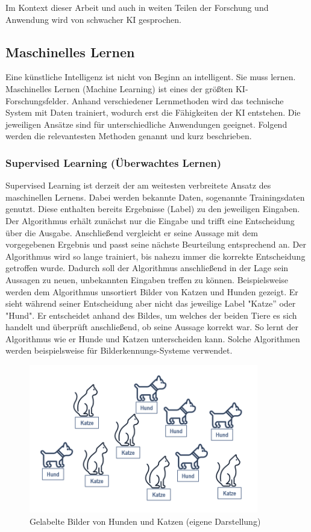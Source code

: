 \documentclass[a4paper,12pt, german]{report}
\begin{document}
Im Kontext dieser Arbeit und auch in weiten Teilen der Forschung und Anwendung wird von schwacher KI gesprochen.\cite{01}\cite{15}

\subsection{Maschinelles Lernen}

Eine künstliche Intelligenz ist nicht von Beginn an intelligent. Sie muss lernen. Maschinelles Lernen (Machine Learning) ist eines der größten KI-Forschungsfelder. Anhand verschiedener Lernmethoden wird das technische System mit Daten trainiert, wodurch erst die Fähigkeiten der KI entstehen. Die jeweiligen Ansätze sind für unterschiedliche Anwendungen geeignet. \newline
Folgend werden die relevantesten Methoden genannt und kurz beschrieben.\cite{10}

\subsubsection{Supervised Learning (Überwachtes Lernen)} 

Supervised Learning ist derzeit der am weitesten verbreitete Ansatz des maschinellen Lernens. Dabei werden bekannte Daten, sogenannte Trainingsdaten genutzt. Diese enthalten bereits Ergebnisse (Label) zu den jeweiligen Eingaben. Der Algorithmus erhält zunächst nur die Eingabe und trifft eine Entscheidung über die Ausgabe. Anschließend vergleicht er seine Aussage mit dem vorgegebenen Ergebnis und passt seine nächste Beurteilung entsprechend an. Der Algorithmus wird so lange trainiert, bis nahezu immer die korrekte Entscheidung getroffen wurde. Dadurch soll der Algorithmus anschließend in der Lage sein Aussagen zu neuen, unbekannten Eingaben treffen zu können.\cite{01}\cite{05} \newline
Beispielsweise werden dem Algorithmus unsortiert Bilder von Katzen und Hunden gezeigt. Er sieht während seiner Entscheidung aber nicht das jeweilige Label "Katze'' oder "Hund". Er entscheidet anhand des Bildes, um welches der beiden Tiere es sich handelt und überprüft anschließend, ob seine Aussage korrekt war. So lernt der Algorithmus wie er Hunde und Katzen unterscheiden kann. Solche Algorithmen werden beispielsweise für Bilderkennungs-Systeme verwendet. 
\begin{figure}
  \center
  \includegraphics[width=10cm]{images/supervised.png}
  \caption[Gelabelte Bilder von Hunden und Katzen]{Gelabelte Bilder von Hunden und Katzen (eigene Darstellung)}
\end{figure}
\end{document}
